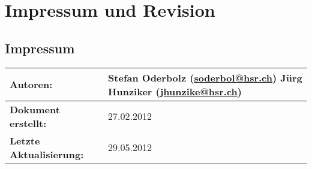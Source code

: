\chapter*{Impressum und Revision}

\section*{Impressum}
\begin{longtable}{|l|p{11cm}|}
\hline 
\textbf{Autoren:} & Stefan Oderbolz (\url{soderbol@hsr.ch}) \newline
Jürg Hunziker (\url{jhunzike@hsr.ch}) \\ 
\hline 
\textbf{Dokument erstellt:} & 27.02.2012 \\ 
\hline 
\textbf{Letzte Aktualisierung:} & 29.05.2012 \\ 
\hline 
\end{longtable}

